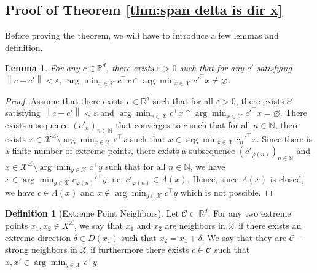 \documentclass[11pt]{article}
\theoremstyle{plain}
\newtheorem{lemma}{Lemma}
\theoremstyle{definition}
\newtheorem{definition}{Definition}
\newcommand{\R}[0]{\mathbb R}
\newcommand{\norm}[1]{\left\lVert#1\right\rVert}
\newcommand{\cX}{\mathcal{X}}
\newcommand{\cC}{\mathcal{C}}
\newcommand{\integ}{\mathbb{N}}
\begin{document}
  \subsection{Proof of Theorem \ref{thm:span delta is dir x}} \label{proof thm:span delta is dir x}
 Before proving the theorem, we will have to introduce a few lemmas and definition.
\begin{lemma} \label{pseudo continuity of argmin}
    For any $c\in \R^d$, there exists $\varepsilon>0$ such that for any $c'$ satisfying $\norm{c-c'}<\varepsilon$, $\arg\min_{x\in \cX}c^\top x \cap \arg\min_{x\in \cX}c'^\top x\neq \varnothing$.
\end{lemma}
\begin{proof}
    Assume that there exists $c\in \R^d$ such that for all $\varepsilon>0$, there exists $c'$ satisfying $\norm{c-c'}<\varepsilon$ and $\arg\min_{x\in \cX}c^\top x \cap \arg\min_{x\in \cX}c'^\top x =\varnothing$. There exists a sequence $(c'_n)_{n \in \integ}$ that converges to $c$ such that for all $n\in \mathbb N$, there exists $x\in \cX^\angle\setminus \arg\min_{x\in \cX}c^\top x$ such that $x\in \arg\min_{x\in \cX}c_n'^\top x$. Since there is a finite number of extreme points, there exists a subsequence $(c'_{\varphi(n)})_{n \in \integ}$ and $x\in \cX^\angle\setminus \arg\min_{y\in \cX}c^\top y$ such that for all $n\in \mathbb N$, we have $x\in \arg\min_{y\in \cX}c_{\varphi(n)}'^\top y$, i.e. $c'_{\varphi(n)}\in \Lambda(x)$. Hence, since $\Lambda(x)$ is closed, we have $c\in \Lambda(x)$ and $x\not\in \arg\min_{y\in \cX}c^\top y$ which is not possible.
\end{proof}

\begin{definition}[Extreme Point Neighbors]
    Let $\cC\subset \R^d$. For any two extreme points $x_1,x_2\in X^\angle$, we say that $x_1$ and $x_2$ are neighbors in $\cX$ if there exists an extreme direction $\delta \in D(x_1)$ such that $x_2=x_1+\delta$. We say that they are $\cC-$strong neighbors in $\cX$ if furthermore there exists $c\in \cC$ such that $x,x'\in \arg\min_{y\in \cX}c^\top y$.
\end{definition}
\end{document}
